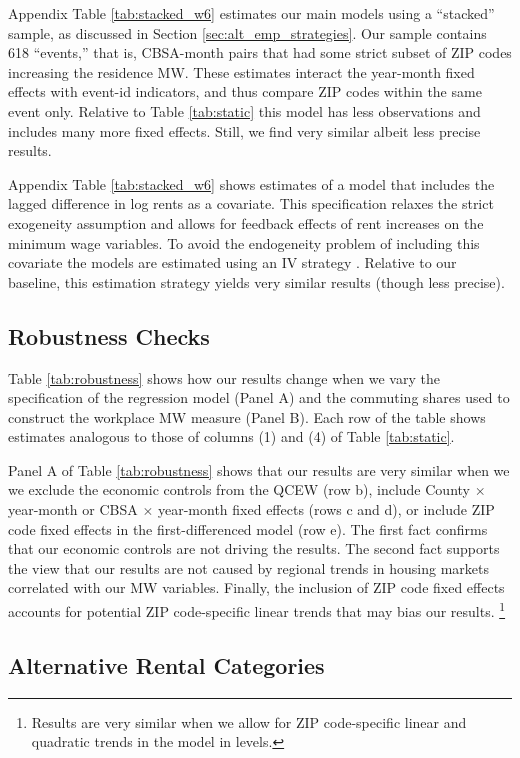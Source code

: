 Appendix Table \ref{tab:stacked_w6} estimates our main models using a ``stacked''
sample, as discussed in Section \ref{sec:alt_emp_strategies}.
Our sample contains 618 ``events,'' that is, CBSA-month pairs that had some 
strict subset of ZIP codes increasing the residence MW.
These estimates interact the year-month fixed effects with event-id indicators, 
and thus compare ZIP codes within the same event only.
Relative to Table \ref{tab:static} this model has less observations and includes 
many more fixed effects.
Still, we find very similar albeit less precise results.

Appendix Table \ref{tab:stacked_w6} shows estimates of a model that includes
the lagged difference in log rents as a covariate.
This specification relaxes the strict exogeneity assumption and allows for 
feedback effects of rent increases on the minimum wage variables.
To avoid the endogeneity problem of including this covariate the models are 
estimated using an IV strategy \parencite{ArellanoBond1991,ArellanoHonore2001}.
Relative to our baseline, this estimation strategy yields very similar results 
(though less precise).

\subsection{Robustness Checks}

Table \ref{tab:robustness} shows how our results change when we vary the
specification of the regression model (Panel A) and the commuting shares used 
to construct the workplace MW measure (Panel B).
Each row of the table shows estimates analogous to those of columns (1) and (4)
of Table \ref{tab:static}.

Panel A of Table \ref{tab:robustness} shows that our results are very similar 
when we we exclude the economic controls from the QCEW (row b), 
include County $\times$ year-month or CBSA $\times$ year-month fixed effects 
(rows c and d),
or include ZIP code fixed effects in the first-differenced model (row e).
The first fact confirms that our economic controls are not driving the results.
The second fact supports the view that our results are not caused by regional 
trends in housing markets correlated with our MW variables.
Finally, the inclusion of ZIP code fixed effects accounts for potential ZIP 
code-specific linear trends that may bias our results.%
\footnote{Results are very similar when we allow for ZIP code-specific
linear and quadratic trends in the model in levels.}

\subsection{Alternative Rental Categories}

